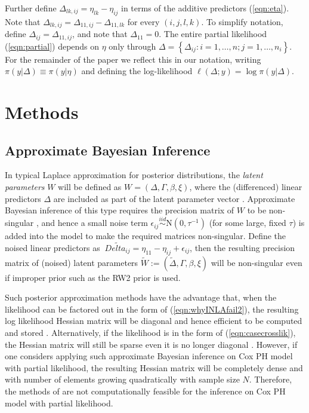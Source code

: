 \documentclass[ba]{imsart}
\begin{document}
Further define $\Delta_{lk,ij} = \eta_{lk} - \eta_{ij}$ in terms of the additive predictors (\ref{eqn:eta}). Note that $\Delta_{lk,ij} = \Delta_{11,ij} - \Delta_{11,lk}$ for every $(i,j,l,k)$. To simplify notation, define $\Delta_{ij} = \Delta_{11,ij}$, and note that $\Delta_{11} = 0$. The entire partial likelihood (\ref{eqn:partial}) depends on $\eta$ only through  $\Delta = \left\{\Delta_{ij}: i = 1,\ldots,n; j = 1,\ldots,n_{i} \right\}$. For the remainder of the paper we reflect this in our notation, writing $\pi(y|\Delta) \equiv \pi(y|\eta)$ and defining the log-likelihood $\ell(\Delta; y) = \log\pi(y|\Delta)$.



\section{Methods}\label{sec:method}


\subsection{Approximate Bayesian Inference}


In typical Laplace approximation for posterior distributions, the \textit{latent parameters} $W$ will be defined as $W = \left(\Delta, \Gamma,\beta, \xi \right)$, where the (differenced) linear predictors $\Delta$ are included as part of the latent parameter vector \citep{inla,inlacoxph,casecross}. Approximate Bayesian inference of this type requires the precision matrix of $W$ to be non-singular \citep{tierney}, and hence a small noise term $\epsilon_{ij} \stackrel{iid}{\sim} \text{N}(0,\tau^{-1})$ (for some large, fixed $\tau$) is added into the model to make the required matrices non-singular. Define the noised linear predictors as $\ \tilde{Delta_{ij}} = \eta_{11} - \eta_{ij} + \epsilon_{ij}$, then the resulting precision matrix of (noised) latent parameters $\tilde{W} := (\tilde{\Delta}, \Gamma,\beta, \xi )$ will be non-singular even if improper prior such as the RW2 prior is used.

Such posterior approximation methods have the advantage that, when the likelihood can be factored out in the form of (\ref{eqn:whyINLAfail2}), the resulting log likelihood Hessian matrix will be diagonal and hence efficient to be computed and stored \citep{inla}. Alternatively, if the likelihood is in the form of (\ref{eqn:casecrosslik}), the Hessian matrix will still be sparse even it is no longer diagonal \citep{casecross}. However, if one considers applying such approximate Bayesian inference on Cox PH model with partial likelihood, the resulting Hessian matrix will be completely dense and with number of elements growing quadratically with sample size $N$. Therefore, the methods of \cite{inla,inlacoxph,casecross} are not computationally feasible for the inference on Cox PH model with partial likelihood. 
\end{document}

